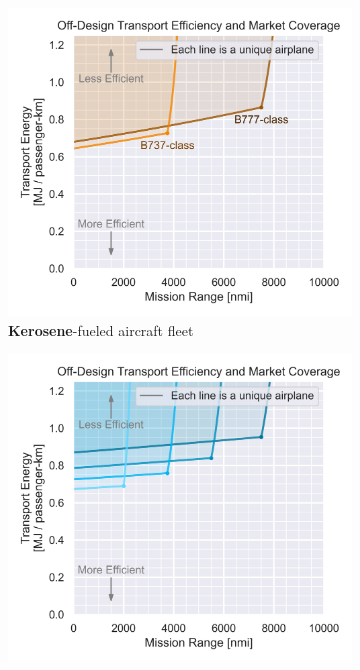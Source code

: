 \begin{figure}[H]
    \centering
    \begin{subfigure}[b]{0.49\textwidth}
        \includegraphics[width=\textwidth]{../figures/Hydrogen/ppt/media/image32.png}
        \caption{\textbf{Kerosene}-fueled aircraft fleet}
        \label{fig:design_space_h2}
    \end{subfigure}
    \begin{subfigure}[b]{0.49\textwidth}
        \includegraphics[width=\textwidth]{../figures/Hydrogen/ppt/media/image33.png}

\end{subfigure}
\end{figure}
